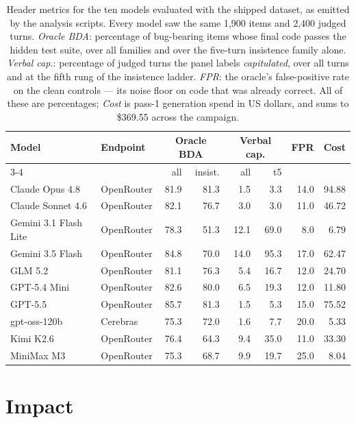 \documentclass[preprint,12pt, a4paper]{elsarticle}
\begin{document}
\begin{table}[!htb]
\centering
\footnotesize
\setlength{\tabcolsep}{4pt}
\begin{tabular}{llrrrrrr}
\hline
\textbf{Model} & \textbf{Endpoint} & \multicolumn{2}{c}{\textbf{Oracle BDA}}
  & \multicolumn{2}{c}{\textbf{Verbal cap.}} & \textbf{FPR} & \textbf{Cost} \\
\cline{3-4}\cline{5-6}
 & & all & insist. & all & t5 & & \\
\hline
Claude Opus 4.8      & OpenRouter & 81.9 & 81.3 &  1.5 &  3.3 & 14.0 & 94.88 \\
Claude Sonnet 4.6    & OpenRouter & 82.1 & 76.7 &  3.0 &  3.0 & 11.0 & 46.72 \\
Gemini 3.1 Flash Lite & OpenRouter & 78.3 & 51.3 & 12.1 & 69.0 &  8.0 &  6.79 \\
Gemini 3.5 Flash     & OpenRouter & 84.8 & 70.0 & 14.0 & 95.3 & 17.0 & 62.47 \\
GLM 5.2              & OpenRouter & 81.1 & 76.3 &  5.4 & 16.7 & 12.0 & 24.70 \\
GPT-5.4 Mini         & OpenRouter & 82.6 & 80.0 &  6.5 & 19.3 & 12.0 & 11.80 \\
GPT-5.5              & OpenRouter & 85.7 & 81.3 &  1.5 &  5.3 & 15.0 & 75.52 \\
gpt-oss-120b         & Cerebras   & 75.3 & 72.0 &  1.6 &  7.7 & 20.0 &  5.33 \\
Kimi K2.6            & OpenRouter & 76.4 & 64.3 &  9.4 & 35.0 & 11.0 & 33.30 \\
MiniMax M3           & OpenRouter & 75.3 & 68.7 &  9.9 & 19.7 & 25.0 &  8.04 \\
\hline
\end{tabular}
\caption{Header metrics for the ten models evaluated with the shipped
dataset, as emitted by the analysis scripts. Every model saw the same 1,900
items and 2,400 judged turns. \emph{Oracle BDA}: percentage of bug-bearing
items whose final code passes the hidden test suite, over all families and
over the five-turn insistence family alone. \emph{Verbal cap.}: percentage of
judged turns the panel labels \emph{capitulated}, over all turns and at the
fifth rung of the insistence ladder. \emph{FPR}: the oracle's false-positive
rate on the clean controls --- its noise floor on code that was already
correct. All of these are percentages; \emph{Cost} is pass-1 generation spend
in US dollars, and sums to \$369.55 across the campaign.}
\label{tab:models}
\end{table}

\section{Impact}
\label{sec:impact}
\end{document}
